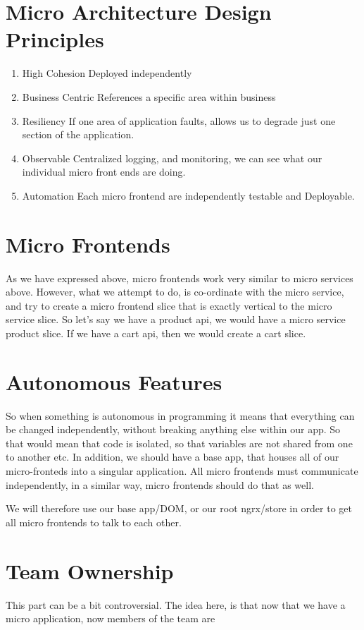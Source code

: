 \section{Micro Architecture Design Principles}
\begin{enumerate}
  \item High Cohesion 
Deployed independently 
  \item Business Centric
References a specific area within business 
  \item Resiliency 
If one area of application faults, allows us to degrade just one section of the application. 
  \item Observable 
Centralized logging, and monitoring, we can see what our individual micro front ends are doing.
  \item Automation 
Each micro frontend are independently testable and Deployable. 
\end{enumerate}

\section{Micro Frontends}
As we have expressed above, micro frontends work very similar to micro services above. However, what we attempt to do, is co-ordinate with the micro service, and try to create a micro frontend slice that is exactly vertical to the micro service slice. So let's say we have a product api, we would have a micro service product slice. If we have a cart api, then we would create a cart slice. 

\section{Autonomous Features}
So when something is autonomous in programming it means that everything can be changed independently, without breaking anything else within our app. So that would mean that code is isolated, so that variables are not shared from one to another etc. In addition, we should have a base app, that houses all of our micro-fronteds into a singular application. All micro frontends must communicate independently, in a similar way, micro frontends should do that as well. 

We will therefore use our base app/DOM, or our root ngrx/store in order to get all micro frontends to talk to each other. 

\section{Team Ownership}
This part can be a bit controversial. The idea here, is that now that we have a micro application, now members of the team are 